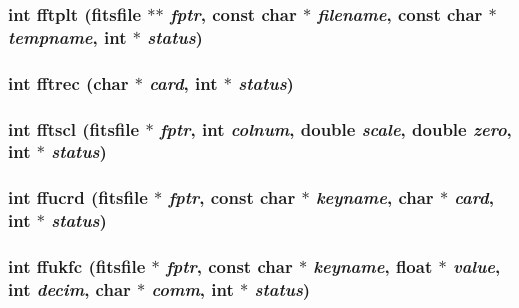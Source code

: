 \subsubsection{\setlength{\rightskip}{0pt plus 5cm}int fftplt (\bf{fitsfile} $\ast$$\ast$ {\em fptr}, const char $\ast$ {\em filename}, const char $\ast$ {\em tempname}, int $\ast$ {\em status})}\label{fitsio_8h_d6eb6624c7f8a5f97f9128969f307cd8}


\subsubsection{\setlength{\rightskip}{0pt plus 5cm}int fftrec (char $\ast$ {\em card}, int $\ast$ {\em status})}\label{fitsio_8h_790ab8b814352c996191e4eed875c843}


\subsubsection{\setlength{\rightskip}{0pt plus 5cm}int fftscl (\bf{fitsfile} $\ast$ {\em fptr}, int {\em colnum}, double {\em scale}, double {\em zero}, int $\ast$ {\em status})}\label{fitsio_8h_189576cb1cc68cb3339679ea81efa79e}


\subsubsection{\setlength{\rightskip}{0pt plus 5cm}int ffucrd (\bf{fitsfile} $\ast$ {\em fptr}, const char $\ast$ {\em keyname}, char $\ast$ {\em card}, int $\ast$ {\em status})}\label{fitsio_8h_e18c3770ab750f65ed969ed243adc779}


\subsubsection{\setlength{\rightskip}{0pt plus 5cm}int ffukfc (\bf{fitsfile} $\ast$ {\em fptr}, const char $\ast$ {\em keyname}, float $\ast$ {\em value}, int {\em decim}, char $\ast$ {\em comm}, int $\ast$ {\em status})}\label{fitsio_8h_a327f0515451f35b7ed8e6c31bc92421}


